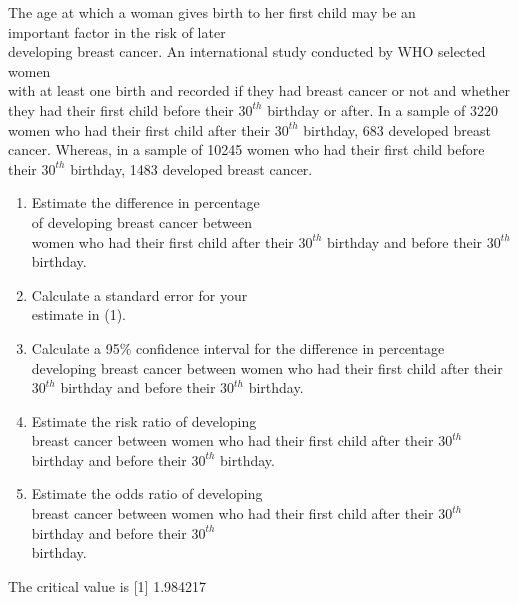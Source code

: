\documentclass[11pt, chapterprefix=true]{scrbook}\usepackage[]{graphicx}\usepackage[]{color}
\begin{document}
\begin{exercises}
\begin{exercise}
The age at which a woman gives birth to her first child may be an \\ important factor in the risk of later \\ developing breast cancer.  An international study conducted by WHO selected women \\ with at least one birth and recorded if they had breast cancer or not and whether they had their first child before their $30^{th}$ birthday or after. In a sample of 3220 women who had their first child after their $30^{th}$ birthday, 683 developed breast cancer.  Whereas, in a sample of 10245 women who had their first child before their $30^{th}$ birthday, 1483 developed breast cancer.

	  \begin{enumerate}
	  \item Estimate the difference in percentage \\ of developing breast cancer between \\ women who had their first child after their $30^{th}$ birthday and before their $30^{th}$ birthday.
    \item Calculate a standard error for your \\ estimate in (1).
    \item Calculate a 95\% confidence interval for the difference in percentage developing breast cancer between women who had their first child after their $30^{th}$ birthday and before their $30^{th}$ birthday.
    \item Estimate the risk ratio of developing \\ breast cancer between women who had their first child after their $30^{th}$ birthday and before their $30^{th}$ birthday.
    \item Estimate the odds ratio of developing \\ breast cancer between women who had their first child after their $30^{th}$ \\ birthday and before their $30^{th}$ \\ birthday.
	  \end{enumerate}
  \end{exercise}
  \begin{solution}  %

   The critical value is
[1] 1.984217

  \end{solution}

  \begin{exercise} %


\end{exercise}
\end{exercises}
\end{document}
